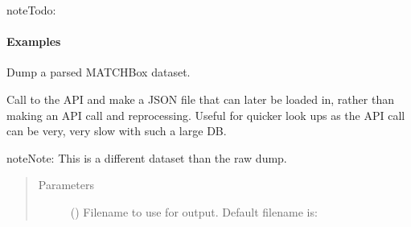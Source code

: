 \documentclass[letterpaper,10pt,english]{sphinxmanual}
\begin{document}
\begin{fulllineitems}
\begin{fulllineitems}
\begin{sphinxadmonition}{note}{\label{matchbox_api_utils:index-0}Todo:}
\begin{itemize}
\end{itemize}
\end{sphinxadmonition}
\paragraph{Examples}

%
\begin{sphinxVerbatim}[commandchars=\\\{\}]
\end{sphinxVerbatim}

\end{fulllineitems}


\begin{fulllineitems}
\label{\detokenize{matchbox_api_utils:matchbox_api_utils.match_data.MatchData.matchbox_dump}}
Dump a parsed MATCHBox dataset.

Call to the API and make a JSON file that can later be loaded in, rather
than making an API call and reprocessing. Useful for quicker look ups as
the API call can be very, very slow with such a large DB.

\begin{sphinxadmonition}{note}{Note:}
This is a different dataset than the raw dump.
\end{sphinxadmonition}
\begin{quote}\begin{description}
\item[{Parameters}] \leavevmode
{} () \textendash{} 
Filename to use for output. Default filename is:


\end{description}
\end{quote}
\end{fulllineitems}
\end{fulllineitems}
\end{document}
